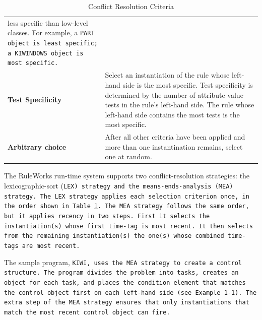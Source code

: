 \begin{table}[h]
\begin{tabularx}{\columnwidth}{lX}
                                 less specific than       
                                 low-level classes. For   
                                 example, a \tt{PART} object is 
                                 least specific; a        
                                 \tt{KIWINDOWS} object is most 
                                 specific. \\
    \textbf{Test Specificity} &  Select an instantiation 
                                of the rule whose        
                                left-hand side is the    
                                most specific.          
                                Test specificity is     
                                determined by the number 
                                of attribute-value tests 
                                in the rule's left-hand  
                                side. The rule whose     
                                left-hand side contains 
                                the most tests is the    
                                most specific. \\
    \textbf{Arbitrary choice} &  After all other criteria 
                                have been applied and   
                                more than one            
                                instantination remains,  
                                select one at random. \\
    \bottomrule
  \end{tabularx}
  \caption{Conflict Resolution Criteria}
  \label{t:crc}
\end{table}

The RuleWorks run-time system supports two conflict-resolution
strategies: the lexicographic-sort (\tt{LEX}) strategy and the
means-ends-analysis (\tt{MEA}) strategy. The \tt{LEX} strategy applies
each selection criterion once, in the order shown in
Table~\ref{t:crc}. The \tt{MEA} strategy follows the same order, but
it applies recency in two steps. First it selects the instantiation(s)
whose first time-tag is most recent. It then selects from the
remaining instantiation(s) the one(s) whose combined time-tags are
most recent.

The sample program, \tt{KIWI}, uses the \tt{MEA} strategy to create a
control structure. The program divides the problem into tasks, creates
an object for each task, and places the condition element that matches
the control object first on each left-hand side (see Example 1-1). The
extra step of the \tt{MEA} strategy ensures that only instantiations
that match the most recent control object can fire.

